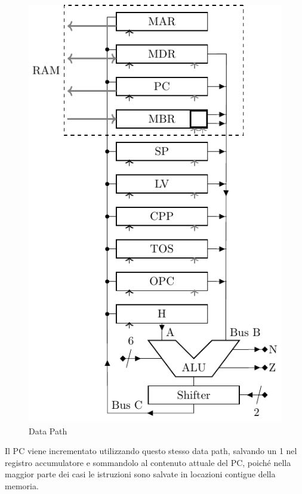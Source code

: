 \documentclass{article}
\numberwithin{equation}{subsection}
\begin{document}
\begin{figure}[H]%
    \centering%
    \includegraphics{data-path.pdf}%
    \caption{Data Path}
\end{figure}

Il PC viene incrementato utilizzando questo stesso data path, salvando un 1 nel registro accumulatore e sommandolo al contenuto attuale del PC, poiché nella maggior parte dei casi le 
istruzioni sono salvate in locazioni contigue della memoria. 
\end{document}
